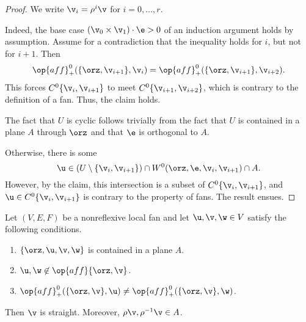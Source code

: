 \begin{proof} 
We write $\v_i = \rho^i \v$ for $i=0,\ldots,r$.

Indeed, the base case $(\v_0\times \v_1)\cdot \e > 0$ of an induction
argument holds by assumption.  Assume for a contradiction that the
inequality holds for $i$, but not for $i+1$.  Then
\[ 
  \op{aff}^0_+(\{\orz,\v_{i+1}\},\v_i) 
= \op{aff}^0_+(\{\orz,\v_{i+1}\},\v_{i+2}).
\]  
This forces $C^0\{\v_i,\v_{i+1}\}$ to meet $C^0\{\v_{i+1},\v_{i+2}\}$,
which is contrary to the definition of a fan.  Thus, the claim holds.

The fact that $U$ is cyclic follows trivially from the fact that $U$
is contained in a plane $A$ through $\orz$ and that $\e$ is orthogonal
to $A$.

Otherwise, there is some 
\[ 
  \u \in (U\setminus \{\v_i,\v_{i+1}\}) 
\cap W^0(\orz,\e,\v_i,\v_{i+1}) \cap A.
\] 
However, by the claim, this intersection is a subset of $C^0\{\v_i,\v_{i+1}\}$, and
$\u\in C^0\{\v_i,\v_{i+1}\}$ is contrary to the property
 of fans.  The result ensues.
\end{proof}

\begin{lemma}[] \label{lemma:A}  
Let $(V,E,F)$ be a nonreflexive local fan and let
  $\u,\v,\w\in V$ satisfy the following conditions.
\begin{enumerate}\wasitemize 
\item $\{\orz,\u,\v,\w\}$ is contained in a plane $A$. \vspace{3pt}
\item $\u,\w\not\in\op{aff}\{\orz,\v\}$. \vspace{3pt}
\item $\op{aff}^0_+(\{\orz,\v\},\u) \ne \op{aff}^0_+(\{\orz,\v\},\w)$.
\end{enumerate}\wasitemize 
Then $\v$ is straight.  Moreover, $\rho \v,\rho^{-1} \v\in A$.
\end{lemma}

